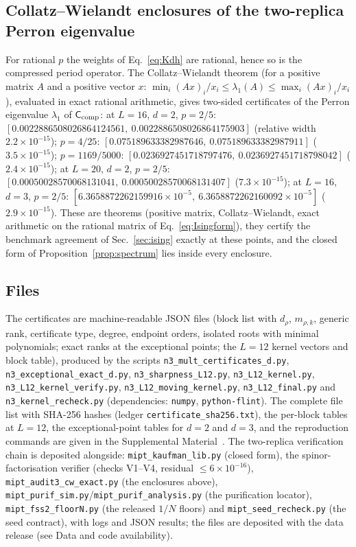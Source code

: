\documentclass[aps,prx,reprint,superscriptaddress,nobibnotes,longbibliography]{revtex4-2}
\theoremstyle{remark}
\newcommand{\Ccomp}{\mathsf C_{\rm comp}}
\begin{document}
\subsection{Collatz--Wielandt enclosures of the two-replica Perron eigenvalue}
\label{app:enclosures}
For rational $p$ the weights of Eq.~\eqref{eq:Kdh} are rational, hence so is the compressed period operator.  The Collatz--Wielandt theorem (for a positive matrix $A$ and a positive vector $x$: $\min_i(Ax)_i/x_i\le\lambda_1(A)\le\max_i(Ax)_i/x_i$), evaluated in exact rational arithmetic, gives two-sided certificates of the Perron eigenvalue $\lambda_1$ of $\Ccomp$: at $L=16$, $d=2$, $p=2/5$: $[0.0022886508026864124561,\ 0.0022886508026864175903]$ (relative width $2.2\times10^{-15}$); $p=4/25$: $[0.075189633382987646,\ 0.075189633382987911]$ ($3.5\times10^{-15}$); $p=1169/5000$: $[0.0236927451718797476,\ 0.0236927451718798042]$ ($2.4\times10^{-15}$); at $L=20$, $d=2$, $p=2/5$: $[0.00050028570068131041,\ 0.00050028570068131407]$ ($7.3\times10^{-15}$); at $L=16$, $d=3$, $p=2/5$: $[6.3658872262159916\times10^{-5},\ 6.3658872262160092\times10^{-5}]$ ($2.9\times10^{-15}$).  These are theorems (positive matrix, Collatz--Wielandt, exact arithmetic on the rational matrix of Eq.~\eqref{eq:Isingform}), they certify the benchmark agreement of Sec.~\ref{sec:ising} exactly at these points, and the closed form of Proposition~\ref{prop:spectrum} lies inside every enclosure.

\subsection{Files}
\label{app:files}

The certificates are machine-readable JSON files (block list with $d_\rho$, $m_{\rho,k}$, generic rank, certificate type, degree, endpoint orders, isolated roots with minimal polynomials; exact ranks at the exceptional points; the $L=12$ kernel vectors and block table), produced by the scripts \texttt{n3\_mult\_certificates\_d.py}, \texttt{n3\_exceptional\_exact\_d.py}, \texttt{n3\_sharpness\_L12.py}, \texttt{n3\_L12\_kernel.py}, \texttt{n3\_L12\_kernel\_verify.py}, \texttt{n3\_L12\_moving\_kernel.py}, \texttt{n3\_L12\_final.py} and \texttt{n3\_kernel\_recheck.py} (dependencies: \texttt{numpy}, \texttt{python-flint}).  The complete file list with SHA-256 hashes (ledger \texttt{certificate\_sha256.txt}), the per-block tables at $L=12$, the exceptional-point tables for $d=2$ and $d=3$, and the reproduction commands are given in the Supplemental Material~\cite{SM}.  The two-replica verification chain is deposited alongside: \texttt{mipt\_kaufman\_lib.py} (closed form), the spinor-factorisation verifier (checks V1--V4, residual $\le6\times10^{-16}$), \texttt{mipt\_audit3\_cw\_exact.py} (the enclosures above), \texttt{mipt\_purif\_sim.py}/\texttt{mipt\_purif\_analysis.py} (the purification locator), \texttt{mipt\_fss2\_floorN.py} (the released $1/N$ floors) and \texttt{mipt\_seed\_recheck.py} (the seed contract), with logs and JSON results; the files are deposited with the data release (see Data and code availability).
\end{document}
